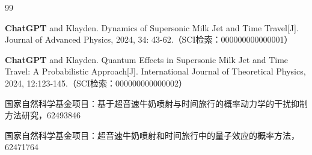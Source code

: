 \begin{publications}{99}

\item[] {\songbf{}}
\item \textbf{ChatGPT} and Klayden. Dynamics of Supersonic Milk Jet and Time Travel[J]. Journal of Advanced Physics, 2024, 34: 43-62.（SCI检索：000000000000001）
\item \textbf{ChatGPT} and Klayden. Quantum Effects in Supersonic Milk Jet and Time Travel: A Probabilistic Approach[J]. International Journal of Theoretical Physics, 2024, 12:123-145.（SCI检索：000000000000002）
\vspace{1.0cm}

\item[] {\songbf{}}
\setcounter{enumiv}{0}
\item 国家自然科学基金项目：基于超音速牛奶喷射与时间旅行的概率动力学的干扰抑制方法研究，62493846
\item 国家自然科学基金项目：超音速牛奶喷射和时间旅行中的量子效应的概率方法，62471764

\end{publications}



